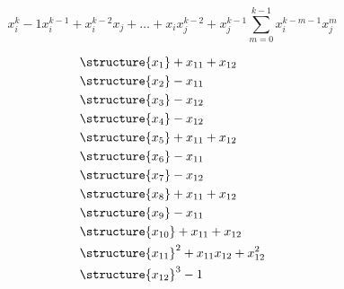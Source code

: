 \documentclass{beamer}
\begin{document}
\begin{frame}
    \frametitle{}
    \framesubtitle{}

    \begin{equation*}
        x_{i}^k - 1
        x_{i}^{k-1} + x_{i}^{k-2} x_{j} + \ldots + x_{i} x_{j}^{k-2} + x_{j}^{k-1}
        \sum_{m = 0}^{k-1} x_{i}^{k-m-1} x_{j}^{m}
    \end{equation*}

    \begin{align*}
        & \structure{x_{1}} + x_{11} + x_{12}             \\
        & \structure{x_{2}} - x_{11}                      \\
        & \structure{x_{3}} - x_{12}                      \\
        & \structure{x_{4}} - x_{12}                      \\
        & \structure{x_{5}} + x_{11} + x_{12}             \\
        & \structure{x_{6}} - x_{11}                      \\
        & \structure{x_{7}} - x_{12}                      \\
        & \structure{x_{8}} + x_{11} + x_{12}             \\
        & \structure{x_{9}} - x_{11}                      \\
        & \structure{x_{10}} + x_{11} + x_{12}            \\
        & \structure{x_{11}}^2 + x_{11} x_{12} + x_{12}^2 \\
        & \structure{x_{12}}^3 - 1
    \end{align*}
\end{frame}
\end{document}

